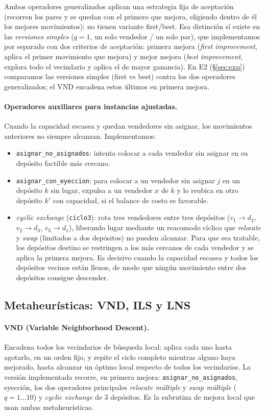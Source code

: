 \documentclass[11pt,a4paper]{article}
\newcommand{\code}[1]{\texttt{#1}}
\begin{document}
Ambos operadores generalizados aplican una estrategia fija de aceptación (recorren los pares y
se quedan con el primero que mejora, eligiendo dentro de él los mejores movimientos): no tienen
variante first/best. Esa distinción sí existe en las \emph{versiones simples} ($q{=}1$, un solo
vendedor / un solo par), que implementamos por separado con dos criterios de aceptación: primera
mejora (\emph{first improvement}, aplica el primer movimiento que mejora) y mejor mejora
(\emph{best improvement}, explora todo el vecindario y aplica el de mayor ganancia). En E2
(\S\ref{sec:exp}) comparamos las versiones simples (first vs best) contra los dos operadores
generalizados; el VND encadena estos últimos en primera mejora.

\paragraph{Operadores auxiliares para instancias ajustadas.} Cuando la capacidad escasea y
quedan vendedores sin asignar, los movimientos anteriores no siempre alcanzan. Implementamos:
\begin{itemize}
  \item \code{asignar\_no\_asignados}: intenta colocar a cada vendedor sin asignar en su
        depósito factible más cercano.
  \item \code{asignar\_con\_eyeccion}: para colocar a un vendedor sin
        asignar $j$ en un depósito $k$ sin lugar, expulsa a un vendedor $x$ de $k$ y lo reubica
        en otro depósito $k'$ con capacidad, si el balance de costo es favorable.
  \item \emph{cyclic exchange} (\code{ciclo3}): rota tres vendedores entre tres depósitos
        ($v_1\to d_2$, $v_2\to d_3$, $v_3\to d_1$), liberando lugar mediante un reacomodo cíclico
        que \emph{relocate} y \emph{swap} (limitados a dos depósitos) no pueden alcanzar. Para que
        sea tratable, los depósitos destino se restringen a los más cercanos de cada vendedor y se
        aplica la primera mejora. Es decisivo cuando la capacidad escasea y todos los depósitos
        vecinos están llenos, de modo que ningún movimiento entre dos depósitos consigue descender.
\end{itemize}

\subsection{Metaheurísticas: VND, ILS y LNS}
\paragraph{VND (Variable Neighborhood Descent).} Encadena todos los vecindarios de búsqueda
local: aplica cada uno hasta agotarlo, en un orden fijo, y repite el ciclo completo mientras
alguno haya mejorado, hasta alcanzar un óptimo local respecto de todos los vecindarios. La
versión implementada recorre, en primera mejora: \code{asignar\_no\_asignados}, eyección, los dos
operadores principales \emph{relocate múltiple} y \emph{swap múltiple} ($q{=}1\dots10$) y
\emph{cyclic exchange} de 3 depósitos. Es la subrutina de mejora local que usan ambas
metaheurísticas.
\end{document}
